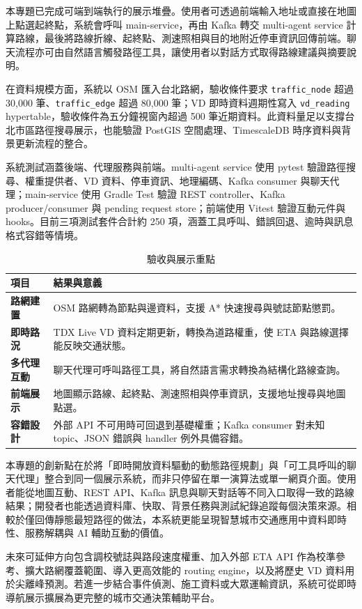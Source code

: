 \documentclass[12pt,a4paper]{article}
\newcommand{\sectiontitle}[1]{\vspace{0.8em}\noindent{\fontsize{16}{19}\selectfont\bfseries #1}\par\vspace{0.3em}}
\begin{document}
\sectiontitle{二、專題結果與亮點：}

本專題已完成可端到端執行的展示堆疊。使用者可透過前端輸入地址或直接在地圖上點選起終點，系統會呼叫 main-service，再由 Kafka 轉交 multi-agent service 計算路線，最後將路線折線、起終點、測速照相與目的地附近停車資訊回傳前端。聊天流程亦可由自然語言觸發路徑工具，讓使用者以對話方式取得路線建議與摘要說明。

在資料規模方面，系統以 OSM 匯入台北路網，驗收條件要求 \texttt{traffic\_node} 超過 30,000 筆、\texttt{traffic\_edge} 超過 80,000 筆；VD 即時資料週期性寫入 \texttt{vd\_reading} hypertable，驗收條件為五分鐘視窗內超過 500 筆近期資料。此資料量足以支撐台北市區路徑搜尋展示，也能驗證 PostGIS 空間處理、TimescaleDB 時序資料與背景更新流程的整合。

系統測試涵蓋後端、代理服務與前端。multi-agent service 使用 pytest 驗證路徑搜尋、權重提供者、VD 資料、停車資訊、地理編碼、Kafka consumer 與聊天代理；main-service 使用 Gradle Test 驗證 REST controller、Kafka producer/consumer 與 pending request store；前端使用 Vitest 驗證互動元件與 hooks。目前三項測試套件合計約 250 項，涵蓋工具呼叫、錯誤回退、逾時與訊息格式容錯等情境。

\begin{table}[H]
\caption{驗收與展示重點}
\centering
\begin{tabularx}{\textwidth}{>{\bfseries}p{4cm}X}
\toprule
項目 & 結果與意義 \\
\midrule
路網建置 & OSM 路網轉為節點與邊資料，支援 A* 快速搜尋與號誌節點懲罰。\\
即時路況 & TDX Live VD 資料定期更新，轉換為道路權重，使 ETA 與路線選擇能反映交通狀態。\\
多代理互動 & 聊天代理可呼叫路徑工具，將自然語言需求轉換為結構化路線查詢。\\
前端展示 & 地圖顯示路線、起終點、測速照相與停車資訊，支援地址搜尋與地圖點選。\\
容錯設計 & 外部 API 不可用時可回退到基礎權重；Kafka consumer 對未知 topic、JSON 錯誤與 handler 例外具備容錯。\\
\bottomrule
\end{tabularx}
\end{table}

本專題的創新點在於將「即時開放資料驅動的動態路徑規劃」與「可工具呼叫的聊天代理」整合到同一個展示系統，而非只停留在單一演算法或單一網頁介面。使用者能從地圖互動、REST API、Kafka 訊息與聊天對話等不同入口取得一致的路線結果；開發者也能透過資料庫、快取、背景任務與測試紀錄追蹤每個決策來源。相較於僅回傳靜態最短路徑的做法，本系統更能呈現智慧城市交通應用中資料即時性、服務解耦與 AI 輔助互動的價值。

未來可延伸方向包含調校號誌與路段速度權重、加入外部 ETA API 作為校準參考、擴大路網覆蓋範圍、導入更高效能的 routing engine，以及將歷史 VD 資料用於尖離峰預測。若進一步結合事件偵測、施工資料或大眾運輸資訊，系統可從即時導航展示擴展為更完整的城市交通決策輔助平台。
\end{document}
